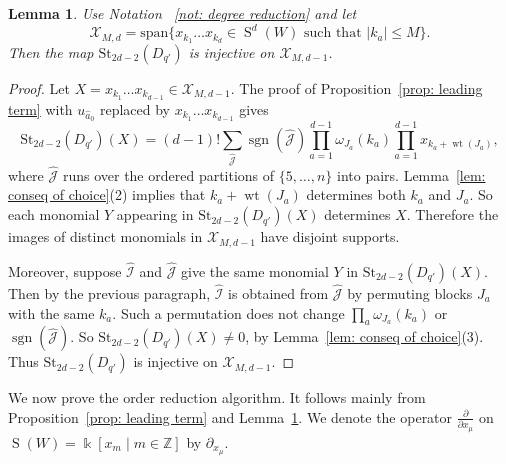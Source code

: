 \documentclass[12pt]{amsart}
\theoremstyle{plain}
\newtheorem{lemma}[theorem]{Lemma}
\theoremstyle{definition}
\numberwithin{equation}{theorem}
\newcommand{\kk}{\Bbbk}
\newcommand{\Sa}{\operatorname{S}}
\newcommand{\sgn}{\operatorname{sgn}}
\newcommand{\ZZ}{\mathbb{Z}}
\newcommand{\mc}[1]{\mathcal{#1}}
\newcommand{\St}{\mathrm{St}}
\newcommand{\length}[1]{\left\lvert #1\right\rvert}
\newcommand{\Span}{\mathrm{span}}
\newcommand{\wt}{\operatorname{wt}}
\begin{document}
\begin{lemma}\label{lem:injective}
    Use Notation ~\ref{not: degree reduction} and let 
    \[\mc{X}_{M,d} = \Span\{x_{k_1}\dots x_{k_{d}} \in \Sa^{d}(W) \text{ such that } \length{k_a} \leq M \}.\]
    Then the map $\St_{2d-2}(D_{q'})$ is injective on $\mc{X}_{M, d-1}$.
\end{lemma}
\begin{proof}
    Let $X  = x_{k_1}\dots x_{k_{d-1}} \in \mc{X}_{M, d-1}$. The proof of Proposition~\ref{prop: leading term} with $u_{\hat{a}_0}$ replaced by $x_{k_1}\dots x_{k_{d-1}}$ gives
    \begin{equation}\label{eq: injective help 1}
        \St_{2d-2}(D_{q'})(X) = (d-1)! \sum_{\widehat{\mc{J}}} \sgn(\widehat{\mc{J}}) \prod_{a=1}^{d-1}\omega_{J_a}(k_a) \prod_{a=1}^{d-1} x_{k_a + \wt(J_a)},
    \end{equation}
    where $\widehat{\mc{J}}$ runs over the ordered partitions of $\{5, \dots, n\}$ into pairs. Lemma~\ref{lem: conseq of choice}(2) implies that $k_a + \wt(J_a)$ determines both $k_a$ and $J_a$. So each monomial $Y$ appearing in $\St_{2d-2}(D_{q'})(X)$ determines $X$. Therefore the images of distinct monomials in $\mc X_{M,d-1}$ have disjoint supports.
    
    Moreover, suppose $\widehat{\mc{I}}$ and $\widehat{\mc{J}}$ give the same monomial $Y$ in  $\St_{2d-2}(D_{q'})(X)$. Then by the previous paragraph, $\widehat{\mc{I}}$ is obtained from $\widehat{\mc{J}}$ by permuting blocks $J_a$ with the same $k_a$. Such a permutation does not change $\prod_{a} \omega_{J_a}(k_a)$ or $\sgn(\widehat{\mc{J}})$. So $\St_{2d-2}(D_{q'})(X) \neq 0$, by Lemma~\ref{lem: conseq of choice}(3). Thus $\St_{2d-2}(D_{q'})$ is injective on $\mc{X}_{M, d-1}$.
\end{proof}


We now prove the order reduction algorithm. It follows mainly from Proposition~\ref{prop: leading term} and Lemma~\ref{lem:injective}. We denote the operator $\frac{\partial}{\partial {x_\mu}}$ on $\Sa(W) = \kk[x_m \mid m \in \ZZ]$ by $\partial_{x_\mu}$.
\end{document}
